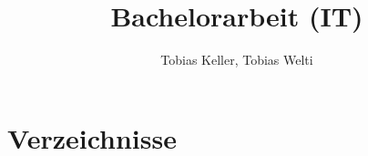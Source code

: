 %
%




\title{Bachelorarbeit (IT)}
\author{Tobias Keller, Tobias Welti}





\setcounter{page}{1}



\tableofcontents
\listoftodos
\newpage















\chapter{Verzeichnisse}\label{chap.verzeichnisse}
 
 \listoffigures
 \listoftables
 \printglossary
 \printglossary[type=acronym]
 \lstlistoflistings
 





